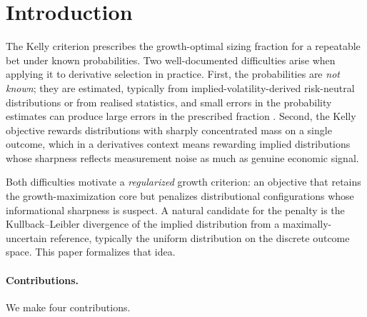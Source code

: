 \documentclass[11pt]{article}
\theoremstyle{definition}
\theoremstyle{remark}
\begin{document}
\section{Introduction}\label{sec:intro}

The Kelly criterion \citep{kelly1956,maclean2011} prescribes the
growth-optimal sizing fraction for a repeatable bet under known
probabilities. Two well-documented difficulties arise when applying it
to derivative selection in practice. First, the probabilities are
\emph{not known}; they are estimated, typically from
implied-volatility-derived risk-neutral distributions
\citep{breeden1978} or from realised statistics, and small errors in
the probability estimates can produce large errors in the prescribed
fraction \citep{maclean2011}. Second, the Kelly objective rewards
distributions with sharply concentrated mass on a single outcome, which
in a derivatives context means rewarding implied distributions whose
sharpness reflects measurement noise as much as genuine economic
signal.

Both difficulties motivate a \emph{regularized} growth criterion: an
objective that retains the growth-maximization core but penalizes
distributional configurations whose informational sharpness is suspect.
A natural candidate for the penalty is the Kullback--Leibler divergence
of the implied distribution from a maximally-uncertain reference,
typically the uniform distribution on the discrete outcome space. This
paper formalizes that idea.

\paragraph{Contributions.}
We make four contributions.
\end{document}
